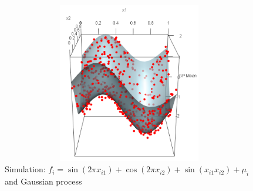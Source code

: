 \begin{enumerate}[leftmargin=*]
\begin{figure}[!h]
	\centering
	\includegraphics[width=340pt, height=200pt]{Chapters/chapter13/figures/GPsim3D.png}
	\caption{Simulation: $f_i=\sin(2\pi x_{i1}) + \cos(2\pi x_{i2}) + \sin(x_{i1} x_{i2}) + \mu_i$ and Gaussian process}
	\label{GPsim3D}
\end{figure} 

	
	
	

\end{enumerate}